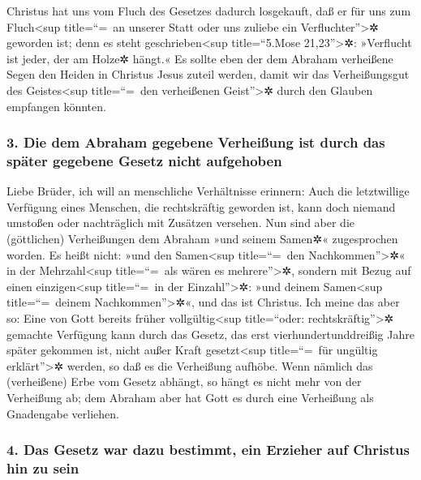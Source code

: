  Christus hat uns vom Fluch des Gesetzes dadurch
losgekauft, daß er für uns zum Fluch\textless sup title=``=~an unserer
Statt oder uns zuliebe ein Verfluchter''\textgreater✲ geworden ist; denn
es steht geschrieben\textless sup title=``5.Mose 21,23''\textgreater✲:
»Verflucht ist jeder, der am Holze✲ hängt.«  Es sollte
eben der dem Abraham verheißene Segen den Heiden in Christus Jesus
zuteil werden, damit wir das Verheißungsgut des Geistes\textless sup
title=``=~den verheißenen Geist''\textgreater✲ durch den Glauben
empfangen könnten.

\hypertarget{die-dem-abraham-gegebene-verheiuxdfung-ist-durch-das-spuxe4ter-gegebene-gesetz-nicht-aufgehoben}{%
\subsubsection{3. Die dem Abraham gegebene Verheißung ist durch das
später gegebene Gesetz nicht
aufgehoben}\label{die-dem-abraham-gegebene-verheiuxdfung-ist-durch-das-spuxe4ter-gegebene-gesetz-nicht-aufgehoben}}

 Liebe Brüder, ich will an menschliche Verhältnisse
erinnern: Auch die letztwillige Verfügung eines Menschen, die
rechtskräftig geworden ist, kann doch niemand umstoßen oder nachträglich
mit Zusätzen versehen.  Nun sind aber die (göttlichen)
Verheißungen dem Abraham »und seinem Samen✲« zugesprochen worden. Es
heißt nicht: »und den Samen\textless sup title=``=~den
Nachkommen''\textgreater✲« in der Mehrzahl\textless sup title=``=~als
wären es mehrere''\textgreater✲, sondern mit Bezug auf einen
einzigen\textless sup title=``=~in der Einzahl''\textgreater✲: »und
deinem Samen\textless sup title=``=~deinem Nachkommen''\textgreater✲«,
und das ist Christus.  Ich meine das aber so: Eine von
Gott bereits früher vollgültig\textless sup title=``oder:
rechtskräftig''\textgreater✲ gemachte Verfügung kann durch das Gesetz,
das erst vierhundertunddreißig Jahre später gekommen ist, nicht außer
Kraft gesetzt\textless sup title=``=~für ungültig erklärt''\textgreater✲
werden, so daß es die Verheißung aufhöbe.  Wenn nämlich
das (verheißene) Erbe vom Gesetz abhängt, so hängt es nicht mehr von der
Verheißung ab; dem Abraham aber hat Gott es durch eine Verheißung als
Gnadengabe verliehen.

\hypertarget{das-gesetz-war-dazu-bestimmt-ein-erzieher-auf-christus-hin-zu-sein}{%
\subsubsection{4. Das Gesetz war dazu bestimmt, ein Erzieher auf
Christus hin zu
sein}\label{das-gesetz-war-dazu-bestimmt-ein-erzieher-auf-christus-hin-zu-sein}}

